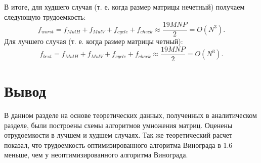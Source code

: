 В итоге, для худшего случая (т. е. когда размер матрицы нечетный) получаем следующую трудоемкость:
\begin{equation}
	f_{worst} = f_{MulH} + f_{MulV} + f_{cycle} + f_{check} \approx \frac{19MNP}{2} = O(N^3).
\end{equation}
Для лучшего случая (т. е. когда размер матрицы четный):
\begin{equation}
	f_{best} = f_{MulH} + f_{MulV} + f_{cycle} + f_{check} \approx \frac{19MNP}{2} = O(N^3).
\end{equation}

\section*{Вывод}
В данном разделе на основе теоретических данных, полученных в аналитическом разделе, были построены схемы алгоритмов умножения матриц. Оценены отрудоемкости в лучшем и худшем случаях. 
Так же теоретический расчет показал, что трудоемкость оптимизированного алгоритма Винограда в 1.6 меньше, чем у неоптимизированного алгоритма Винограда.
